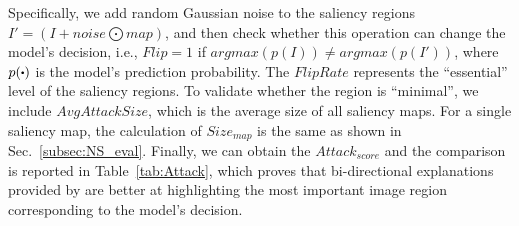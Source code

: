 Specifically, we add random Gaussian noise to the saliency regions $I'=(I + noise \bigodot map)$, and then check whether this operation can change the model's decision, i.e., $Flip = 1$ if ${argmax(p(I))}\neq{argmax(p(I'))}$, where $p(\bigcdot)$ is the model's prediction probability.
The $FlipRate$ represents the ``essential'' level of the saliency regions.
To validate whether the region is ``minimal'', we include $AvgAttackSize$, which is the average size of all saliency maps. 
For a single saliency map, the calculation of $Size_{map}$ is the same as shown in Sec.~\ref{subsec:NS_eval}.
Finally, we can obtain the $Attack_{score}$ and the comparison is reported in Table~\ref{tab:Attack}, which proves that bi-directional explanations provided by \name{} are better at highlighting the most important image region corresponding to the model's decision.

